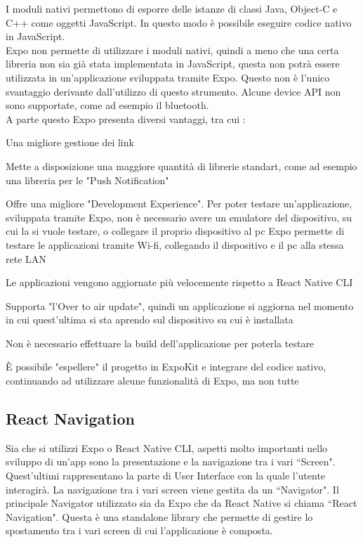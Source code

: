 I moduli nativi permettono di esporre
delle istanze di classi Java, Object-C e C++ come oggetti JavaScript. In questo modo \`e possibile eseguire codice nativo in JavaScript.\\
Expo non permette di utilizzare i moduli nativi, quindi a meno che una certa libreria non sia gi\`a stata implementata in JavaScript, questa non potr\`a essere utilizzata
in un'applicazione sviluppata tramite Expo.
Questo non \`e l'unico svantaggio derivante dall'utilizzo di questo strumento. Alcune device API non sono supportate, come ad esempio il bluetooth.\\
A parte questo Expo presenta diversi vantaggi, tra cui \cite{ReactNative:Sito} \cite{ReactNativeCLI:Expo}:
\begin{list}{*}{}
      \item Una migliore gestione dei link
      \item Mette a disposizione una maggiore quantit\`a di librerie standart, come ad esempio una libreria per le "Push Notification"
      \item Offre una migliore "Development Experience". Per poter testare un'applicazione, sviluppata tramite Expo, non \`e necessario avere un emulatore del dispositivo, su cui la si vuole testare, o collegare il proprio dispositivo al pc
            Expo permette di testare le applicazioni tramite Wi-fi, collegando il dispositivo e il pc alla stessa rete LAN
      \item Le applicazioni vengono aggiornate pi\`u velocemente rispetto a React Native CLI
      \item Supporta "l'Over to air update", quindi un applicazione si aggiorna nel momento in cui quest'ultima si sta aprendo sul dispositivo su cui \`e installata
      \item Non \`e necessario effettuare la build dell'applicazione per poterla testare
      \item \`E possibile "espellere" il progetto in ExpoKit e integrare del codice nativo, continuando ad utilizzare alcune funzionalit\`a di Expo, ma non tutte
\end{list}

\subsection{React Navigation}
Sia che si utilizzi Expo o React Native CLI, aspetti molto importanti nello sviluppo di un'app sono la presentazione e la navigazione tra i vari ``Screen". Quest'ultimi
rappresentano la parte di User Interface con la quale l'utente interagir\`a. La navigazione tra i vari screen
viene gestita da un ``Navigator". Il principale Navigator utilizzato sia da Expo che da React Native si chiama ``React Navigation".
Questa \`e una standalone library che permette di gestire lo spostamento tra i vari screen di cui l'applicazione \`e composta.

